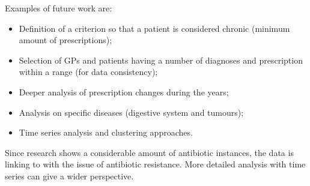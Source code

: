 Examples of future work are:
\begin{itemize}
	\item Definition of a criterion so that a patient is considered chronic (minimum amount of prescriptions);
	\item Selection of GPs and patients having a number of diagnoses and prescription within a range (for data consistency);
	\item Deeper analysis of prescription changes during the years;
	\item Analysis on specific diseases (digestive system and tumours);
	\item Time series analysis and clustering approaches.
\end{itemize}

Since research shows a considerable amount of antibiotic instances, the data is linking to with the issue of antibiotic resistance. More detailed analysis with time series can give a wider perspective.